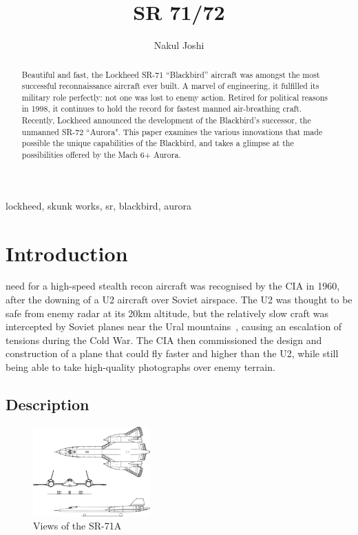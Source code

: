 \documentclass[12pt, draftnocls, onecolumn]{IEEEtran}
\title{SR 71/72}
\author{Nakul Joshi}
\begin{document}
\maketitle

\begin{abstract}
	Beautiful and fast, the Lockheed SR-71 ``Blackbird'' aircraft was amongst the most successful reconnaissance aircraft ever built. A marvel of engineering, it fulfilled its military role perfectly: not one was lost to enemy action. Retired for political reasons in 1998, it continues to hold the record for fastest manned air-breathing craft. Recently, Lockheed announced the development of the Blackbird's successor, the unmanned SR-72 ``Aurora". This paper examines the various innovations that made possible the unique capabilities of the Blackbird, and takes a glimpse at the possibilities offered by the Mach 6+ Aurora.
\end{abstract}

\begin{IEEEkeywords} lockheed, skunk works, sr, blackbird, aurora \end{IEEEkeywords}



\section{Introduction}

	 need for a high-speed stealth recon aircraft was recognised by the CIA in 1960, after the downing of a U2 aircraft over Soviet airspace. The U2 was thought to be safe from enemy radar at its 20km altitude, but the relatively slow craft was intercepted by Soviet planes near the Ural mountains~\cite{u2}, causing an escalation of tensions during the Cold War. The CIA then commissioned the design and construction of a plane that could fly faster and higher than the U2, while still being able to take high-quality photographs over enemy terrain.
	
	\subsection{Description}
	\begin{figure}[h]
		\centering
		\includegraphics[width=0.4\textwidth]{view.pdf}
		\caption{Views of the SR-71A}
	\end{figure}
\end{document}
